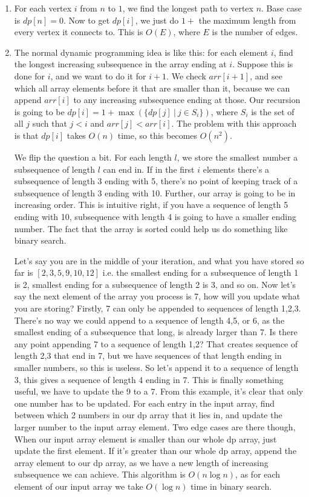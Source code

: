 \documentclass[12pt]{report}
\begin{document}
\begin{enumerate}[label=\textbf{\arabic*.}]
  \item For each vertex $i$ from $n$ to $1$, we find the longest path to vertex $n$. Base case is $dp[n] = 0$. Now to get $dp[i]$, we just do $1 + $ the maximum length from every vertex it connects 
  to. This is $O(E)$, where $E$ is the number of edges.

  \item The normal dynamic programming idea is like this: for each element $i$, find the longest increasing subsequence in the array ending at $i$. Suppose this is done for $i$, and we want to 
  do it for $i+1$. We check $arr[i+1]$, and see which all array elements before it that are smaller than it, because we can append $arr[i]$ to any increasing subsequence ending at those. Our recursion
  is going to be $dp[i] = 1 + \max(\{dp[j] \ | \ j \in S_i\})$, where $S_i$ is the set of all $j$ such that $j < i$ and $arr[j] < arr[i]$. The problem with this approach is that $dp[i]$ takes $O(n)$
  time, so this becomes $O(n^2)$.

  We flip the question a bit. For each length $l$, we store the smallest number a subsequence of length $l$ can end in. If in the first $i$ elements there's a subsequence of length 3 ending with 5, 
  there's no point of keeping track of a subsequence of length 3 ending with 10. Further, our array is going to be in increasing order. This is intuitive right, if you have a sequence of length 5
  ending with 10, subsequence with length 4 is going to have a smaller ending number. The fact that the array is sorted could help us do something like binary search.

  Let's say you are in the middle of your iteration, and what you have stored so far is $[2, 3, 5, 9, 10, 12]$ i.e. the smallest ending for a subsequence of length 1 is 2, smallest ending for a subsequence
  of length 2 is 3, and so on. Now let's say the next element of the array you process is 7, how will you update what you are storing? Firstly, 7 can only be appended to sequences of length 1,2,3. There's no
  way we could append to a sequence of length 4,5, or 6, as the smallest ending of a subsequence that long, is already larger than 7. Is there any point appending 7 to a sequence of length 1,2? That creates
  sequence of length 2,3 that end in 7, but we have sequences of that length ending in smaller numbers, so this is useless. So let's append it to a sequence of length 3, this gives a sequence of length 4 ending 
  in 7. This is finally something useful, we have to update the 9 to a 7. From this example, it's clear that only one number has to be updated. For each entry in the input array, find between which 2 numbers
  in our dp array that it lies in, and update the larger number to the input array element. Two edge cases are there though, When our input array element is smaller than our whole dp array, just update the 
  first element. If it's greater than our whole dp array, append the array element to our dp array, as we have a new length of increasing subsequence we can achieve. This algorithm is $O(n \log n)$, as for 
  each element of our input array we take $O(\log n)$ time in binary search.


\end{enumerate}
\end{document}
